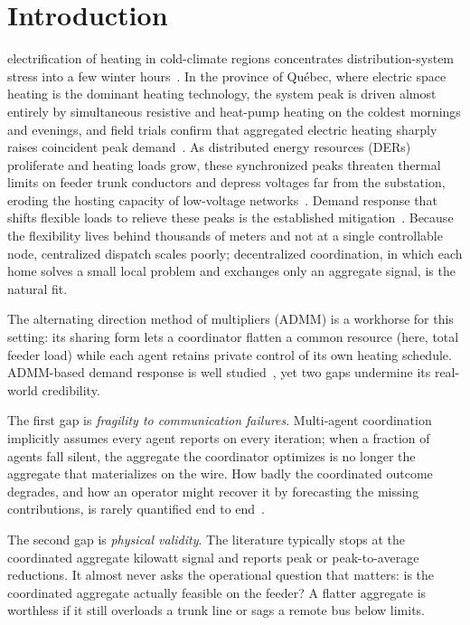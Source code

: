 \section{Introduction}

 electrification of heating in cold-climate regions concentrates
distribution-system stress into a few winter hours~\cite{Knittel2025}. In the
province of Qu\'ebec, where electric space heating is the dominant heating
technology, the system peak is driven almost entirely by simultaneous resistive
and heat-pump heating on the coldest mornings and evenings, and field trials
confirm that aggregated electric heating sharply raises coincident peak
demand~\cite{Love2017}. As distributed energy resources (DERs) proliferate and
heating loads grow, these synchronized peaks threaten thermal limits on feeder
trunk conductors and depress voltages far from the substation, eroding the
hosting capacity of low-voltage networks~\cite{Protopapadaki2017,Edmunds2021}.
Demand response that shifts flexible loads to relieve these peaks is the
established mitigation~\cite{Siano2014}. Because the flexibility lives behind
thousands of meters and not at a single controllable node, centralized dispatch
scales poorly; decentralized coordination, in which each home solves a small
local problem and exchanges only an aggregate signal, is the natural fit.

The alternating direction method of multipliers (ADMM) \cite{boyd2011admm} is a
workhorse for this setting: its sharing form lets a coordinator flatten a common
resource (here, total feeder load) while each agent retains private control of
its own heating schedule. ADMM-based demand response is well
studied~\cite{Tsai2017,Nguyen2018}, yet two gaps undermine its real-world
credibility.

The first gap is \emph{fragility to communication failures}. Multi-agent
coordination implicitly assumes every agent reports on every iteration; when a
fraction of agents fall silent, the aggregate the coordinator optimizes is no
longer the aggregate that materializes on the wire. How badly the coordinated
outcome degrades, and how an operator might recover it by forecasting the
missing contributions, is rarely quantified end to end~\cite{Brown2017,Xu2019}.

The second gap is \emph{physical validity}. The literature typically stops at
the coordinated aggregate kilowatt signal and reports peak or peak-to-average
reductions. It almost never asks the operational question that matters: is the
coordinated aggregate actually feasible on the feeder? A flatter aggregate is
worthless if it still overloads a trunk line or sags a remote bus below limits.


